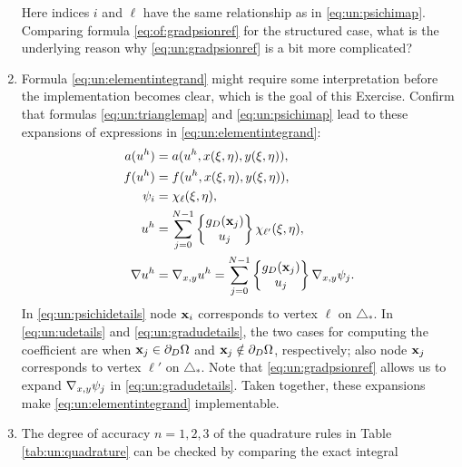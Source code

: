 \begin{enumerate}
\begin{equation}
\end{equation}
Here indices $i$ and $\ell$ have the same relationship as in \eqref{eq:un:psichimap}.  Comparing formula \eqref{eq:of:gradpsionref} for the structured case, what is the underlying reason why \eqref{eq:un:gradpsionref} is a bit more complicated?  %
\item  \label{exer:un:elementintegranddetails}  Formula \eqref{eq:un:elementintegrand} might require some interpretation before the implementation becomes clear, which is the goal of this Exercise.  Confirm that formulas \eqref{eq:un:trianglemap} and \eqref{eq:un:psichimap} lead to these expansions of expressions in \eqref{eq:un:elementintegrand}:
\begin{align}
a(u^h) &= a(u^h,x(\xi,\eta),y(\xi,\eta)), \label{eq:un:adetails} \\
f(u^h) &= f(u^h,x(\xi,\eta),y(\xi,\eta)), \label{eq:un:fdetails} \\
\psi_i &= \chi_{\ell}(\xi,\eta), \label{eq:un:psichidetails} \\
u^h &= \sum_{j=0}^{N-1} \left\{\begin{matrix} g_D(\mathbf{x}_j) \\ u_j \end{matrix}\right\} \chi_{\ell'}(\xi,\eta), \label{eq:un:udetails} \\
\nabla u^h &= \nabla_{x,y} u^h = \sum_{j=0}^{N-1} \left\{\begin{matrix} g_D(\mathbf{x}_j) \\ u_j \end{matrix}\right\} \nabla_{x,y} \psi_j. \label{eq:un:gradudetails}
\end{align}
In \eqref{eq:un:psichidetails} node $\mathbf{x}_i$ corresponds to vertex $\ell$ on $\triangle_\ast$.  In \eqref{eq:un:udetails} and \eqref{eq:un:gradudetails}, the two cases for computing the coefficient are when $\mathbf{x}_j \in \partial_D \Omega$ and $\mathbf{x}_j \notin \partial_D \Omega$, respectively; also node $\mathbf{x}_j$ corresponds to vertex $\ell'$ on $\triangle_\ast$.  Note that \eqref{eq:un:gradpsionref} allows us to expand $\nabla_{x,y} \psi_j$ in \eqref{eq:un:gradudetails}.  Taken together, these expansions make \eqref{eq:un:elementintegrand} implementable.
\item  \label{exer:un:checkquadrature}  The degree of accuracy $n=1,2,3$ of the quadrature rules in Table \ref{tab:un:quadrature} can be checked by comparing the exact integral
\begin{equation}

\end{equation}
\end{enumerate}
